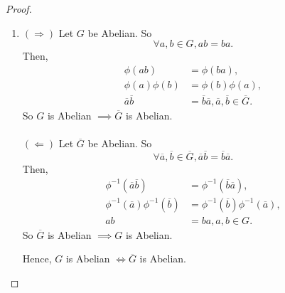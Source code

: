 \documentclass{article}
\theoremstyle{definition}
\begin{document}
\begin{proof}
\begin{enumerate}[label=(\roman*)]
         \item $(\Rightarrow)$ Let $G$ be Abelian. So
         \begin{equation*}
             \forall a,b \in G, ab = ba.
         \end{equation*}
         Then,
         \begin{align*}
             \phi(ab) &= \phi(ba), \\
             \phi(a)\phi(b) &= \phi(b)\phi(a), \\
             \overline{a}\overline{b} &= \overline{b}\overline{a}, \overline{a}, \overline{b} \in \overline{G}.
         \end{align*}
         So $G$ is Abelian $\implies \overline{G}$ is Abelian.
         \\ \\
         $(\Leftarrow)$ Let $\overline{G}$ be Abelian. So
         \begin{equation*}
             \forall \overline{a}, \overline{b} \in \overline{G}, \overline{a}\overline{b} = \overline{b}\overline{a}.
         \end{equation*}
         Then,
         \begin{align*}
             \phi^{-1}(\overline{a}\overline{b}) &= \phi^{-1}(\overline{b}\overline{a}), \\
             \phi^{-1}(\overline{a})\phi^{-1}(\overline{b}) &= \phi^{-1}(\overline{b})\phi^{-1}(\overline{a}), \\
             ab &= ba, a,b \in G.
         \end{align*}
         So $\overline{G}$ is Abelian $\implies G$ is Abelian.
         
         Hence, $G$ is Abelian $\iff \overline{G}$ is Abelian.
         

\end{enumerate}
\end{proof}
\end{document}
